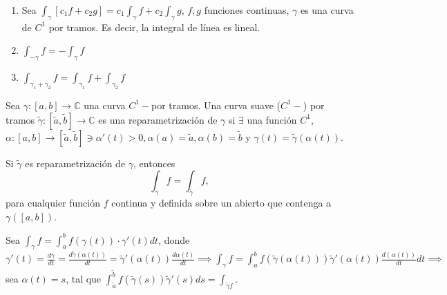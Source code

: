 \begin{prop}
    \begin{enumerate}
        \item Sea $\int_\gamma [c_1f+c_2g]=c_1\int_\gamma f+c_2\int_\gamma g$, $f,g$ funciones continuas, $\gamma$ es una curva de $C^1$ por tramos. Es decir, la integral de línea es lineal. 
        \item $\int_{-\gamma}f=-\int_\gamma f$
        \item $\int_{\gamma_1+\gamma_2}f=\int_{\gamma_1}f+\int_{\gamma_2}f$
    \end{enumerate}
\end{prop}

\begin{definicion}
    Sea $\gamma:[a,b]\to\mathbb{C}$ una curva $C^1-$por tramos. Una curva suave ($C^1-$) por tramos $\tilde{\gamma}:[\tilde{a},\tilde{b}]\to\mathbb{C}$ es una reparametrización de $\gamma$ si $\exists$ una función $C^1$,$\alpha:[a,b]\to[\tilde{a},\tilde{b}]\ni \alpha'(t)>0,\alpha(a)=\tilde{a},\alpha(b)=\tilde{b}$ y $\gamma(t)=\tilde{\gamma}(\alpha(t))$.
\end{definicion}

\begin{prop}
    Si $\tilde{\gamma}$ es reparametrización de $\gamma$, entonces 
    $$\int_\gamma f=\int_{\tilde{\gamma}}f,$$
    para cualquier función $f$ continua y definida sobre un abierto que contenga a $\gamma([a,b])$.
    \begin{dem}
        Sea $\int_\gamma f=\int_a^bf(\gamma(t))\cdot \gamma'(t)dt$, donde $\gamma'(t)=\frac{d\gamma}{dt}=\frac{d\tilde{\gamma}(\alpha(t))}{dt}=\tilde{\gamma}'(\alpha(t))\frac{d\alpha(t)}{dt}\implies \int_\gamma f=\int_a^bf(\tilde{\gamma}(\alpha(t)))\tilde{\gamma}'(\alpha(t))\frac{d(\alpha(t))}{dt}dt\implies$ sea $\alpha(t)=s$, tal que $\int_{\tilde{a}}^{\tilde{b}}f(\tilde{\gamma}(s))\tilde{\gamma}'(s)ds=\int_{\tilde{\gamma}f}$.
    \end{dem}
\end{prop}

